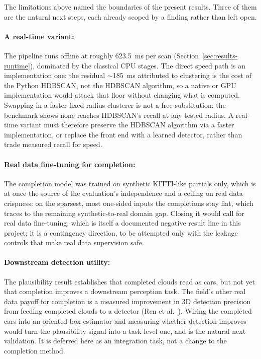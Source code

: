 \documentclass[a4paper,12pt]{report}
\begin{document}
The limitations above named the boundaries of the present results. Three of them are the natural next
steps, each already scoped by a finding rather than left open.

\paragraph{A real-time variant:} The pipeline runs offline at roughly
\SI{623.5}{\milli\second} per scan (Section~\ref{sec:results-runtime}), dominated by the
classical CPU stages. The direct speed path is an implementation one: the residual
$\sim$\SI{185}{\milli\second} attributed to clustering is the cost of the Python
HDBSCAN, not the HDBSCAN algorithm, so a native or GPU implementation would attack
that floor without changing what is computed. Swapping in a faster fixed radius clusterer is
not a free substitution: the benchmark shows none reaches HDBSCAN's recall at any tested
radius. A real-time variant must therefore preserve the HDBSCAN algorithm via a faster
implementation, or replace the front end with a learned detector, rather than trade measured
recall for speed.

\paragraph{Real data fine-tuning for completion:} The completion model was trained on
synthetic KITTI-like partials only, which is at once the source of the evaluation's
independence and a ceiling on real data crispness: on the sparsest, most one-sided inputs the
completions stay flat, which traces to the remaining synthetic-to-real
domain gap. Closing it would call for real data fine-tuning, which is itself a documented
negative result line in this project; it is a contingency
direction, to be attempted only with the leakage controls that make real data supervision
safe.

\paragraph{Downstream detection utility:} The plausibility result establishes that completed
clouds read as cars, but not yet that completion improves a downstream perception task. The
field's other real data payoff for completion is a measured improvement in 3D detection
precision from feeding completed clouds to a detector (Ren et
al.~\cite{ren2022selfsupervised}). Wiring the completed cars into an oriented box estimator
and measuring whether detection improves would turn the plausibility signal into a
task level one, and is the natural next validation. It is deferred here as an integration
task, not a change to the completion method.
\end{document}
